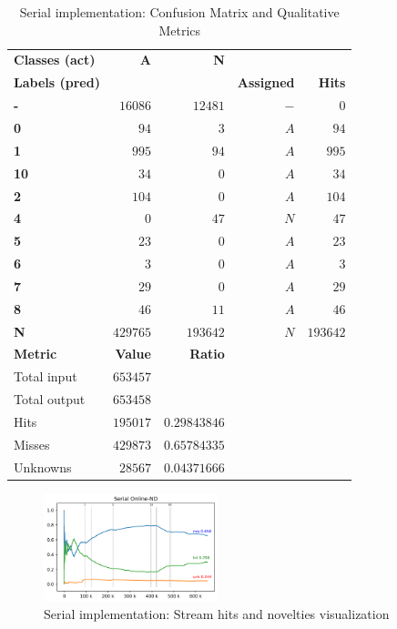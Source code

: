 \small
\begin{table}
  \caption{Serial implementation: Confusion Matrix and Qualitative Metrics}
  \begin{tabular}
    { l                     | r           | r           | r                 | r }
    \textbf{Classes (act)}  & \textbf{A}  & \textbf{N}  \\
    \textbf{Labels (pred)}  &             &             & \textbf{Assigned} & \textbf{Hits} \\
    \hline
    \hline \textbf{-}      &   $16086$   & $12481$     & $-$               &        $0$ \\
    \hline \textbf{0}      &   $94$      & $3$         & $A$               &       $94$ \\
    \hline \textbf{1}      &   $995$     & $94$        & $A$               &      $995$ \\
    \hline \textbf{10}     &   $34$      & $0$         & $A$               &       $34$ \\
    \hline \textbf{2}      &   $104$     & $0$         & $A$               &      $104$ \\
    \hline \textbf{4}      &   $0$       & $47$        & $N$               &       $47$ \\
    \hline \textbf{5}      &   $23$      & $0$         & $A$               &       $23$ \\
    \hline \textbf{6}      &   $3$       & $0$         & $A$               &        $3$ \\
    \hline \textbf{7}      &   $29$      & $0$         & $A$               &       $29$ \\
    \hline \textbf{8}      &   $46$      & $11$        & $A$               &       $46$ \\
    \hline \textbf{N}      &   $429765$  & $193642$    & $N$               &   $193642$ \\
    \hline
    \hline \textbf{Metric}  & \textbf{Value}  & \textbf{Ratio}   \\
    \hline Total input      & $653457$        &               \\
    \hline Total output     & $653458$        &               \\
    \hline Hits             & $195017$        & $0.29843846$  \\
    \hline Misses           & $429873$        & $0.65784335$ \\
    \hline Unknowns         & $ 28567 $       & $0.04371666$ \\
  \end{tabular}
  \label{fig:serial-matrix}
\end{table}

\begin{figure}[htbp]
  \centerline{\includegraphics[width=0.45\textwidth]{experiments/online-nd.log.png}}
  \caption{Serial implementation: Stream hits and novelties visualization}
  \label{fig:serial-hits}
\end{figure}

\normalsize

